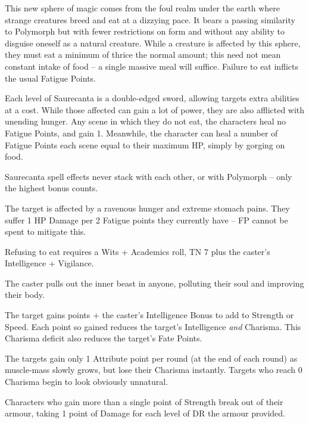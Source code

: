 
\begin{multicols}{2}

\noindent
This new sphere of magic comes from the foul realm under the earth where strange creatures breed and eat at a dizzying pace.
It bears a passing similarity to Polymorph but with fewer restrictions on form and without any ability to disguise oneself as a natural creature.
While a creature is affected by this sphere, they must eat a minimum of thrice the normal amount; this need not mean constant intake of food -- a single massive meal will suffice.
Failure to eat inflicts the usual Fatigue Points.

Each level of Saurecanta is a double-edged sword, allowing targets extra abilities at a cost.
While those affected can gain a lot of power, they are also afflicted with unending hunger.
Any scene in which they do not eat, the characters heal no Fatigue Points, and gain 1.
Meanwhile, the character can heal a number of Fatigue Points each scene equal to their maximum HP, simply by gorging on food.

Saurecanta spell effects never stack with each other, or with Polymorph -- only the highest bonus counts.

\spelllevel \label{saurecantaone}
The target is affected by a ravenous hunger and extreme stomach pains.
They suffer 1 HP Damage per 2 Fatigue points they currently have -- FP cannot be spent to mitigate this.

Refusing to eat requires a Wits + Academics roll, TN 7 plus the caster's Intelligence + Vigilance.

\spelllevel
{}
The caster pulls out the inner beast in anyone, polluting their soul and improving their body.

The target gains  points + the caster's Intelligence Bonus to add to Strength or Speed.
Each point so gained reduces the target's Intelligence \emph{and} Charisma.
This Charisma deficit also reduces the target's Fate Points.

The targets gain only 1 Attribute point per round (at the end of each round) as muscle-mass slowly grows, but lose their Charisma instantly.
Targets who reach 0 Charisma begin to look obviously unnatural.

Characters who gain more than a single point of Strength break out of their armour, taking 1 point of Damage for each level of DR the armour provided.


\end{multicols}
